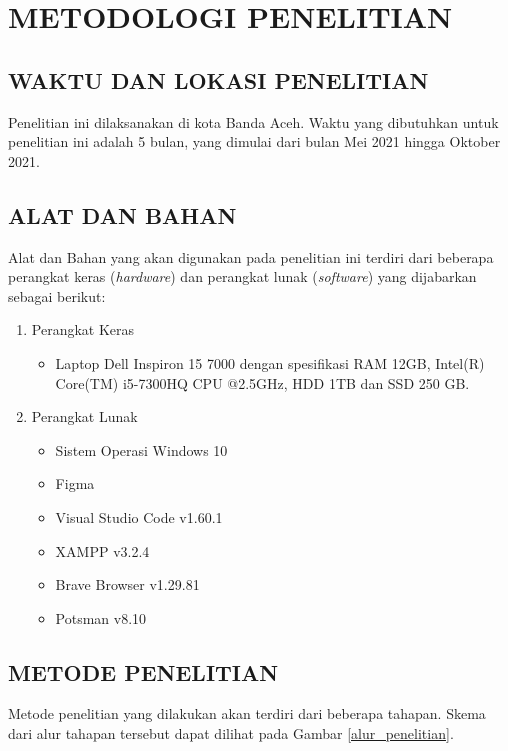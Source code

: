 \fancyhf{} 
\fancyfoot[C]{\thepage}
\chapter{METODOLOGI PENELITIAN}

\section{\uppercase{WAKTU DAN LOKASI PENELITIAN}}
Penelitian ini dilaksanakan di kota Banda Aceh. Waktu yang dibutuhkan untuk penelitian ini adalah 5 bulan, yang dimulai dari bulan Mei 2021 hingga Oktober 2021.

\section{\uppercase{ALAT DAN BAHAN}}
Alat dan Bahan yang akan digunakan pada penelitian ini terdiri dari beberapa perangkat keras (\textit{hardware}) dan perangkat lunak (\textit{software}) yang dijabarkan sebagai berikut:

\begin{enumerate}
\item Perangkat Keras
	\begin{itemize}
	\item Laptop Dell Inspiron 15 7000 dengan spesifikasi RAM 12GB, Intel(R) Core(TM) i5-7300HQ CPU @2.5GHz, HDD 1TB dan SSD 250 GB.
	\end{itemize}

\item Perangkat Lunak
	\begin{itemize}
	\item Sistem Operasi Windows 10
	\item Figma
	\item Visual Studio Code v1.60.1
	\item XAMPP v3.2.4
	\item Brave Browser v1.29.81
	\item Potsman v8.10
	\end{itemize}
\end{enumerate}

\section{\uppercase{METODE PENELITIAN}}
Metode penelitian yang dilakukan akan terdiri dari beberapa tahapan. Skema dari alur tahapan tersebut dapat dilihat pada Gambar \ref{alur_penelitian}.

